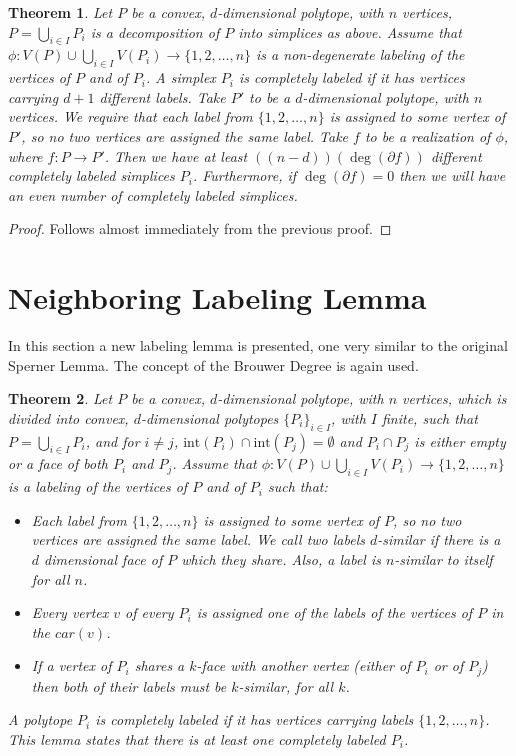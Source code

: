 \documentclass[11pt]{amsart}
\newtheorem{thm}{Theorem}[section]
\theoremstyle{definition}
\theoremstyle{remark}
\numberwithin{equation}{section}
\theoremstyle{definition}
\newcommand{\inte}{\textrm{int}}
\begin{document}
	\begin{thm}\label{generlization 1} Let $P$ be a convex, $d$-dimensional polytope, with $n$ vertices,  $P=\bigcup_{i\in I}P_i$ is a decomposition of $P$ into simplices as above. Assume that $\phi:V(P)\cup\bigcup_{i\in I}V(P_i)\to\{1,2,\ldots,n\}$ is a \emph{non-degenerate} labeling of the vertices of $P$ and of $P_i$. A simplex $P_i$ is completely labeled if it has vertices carrying $d+1$ different labels. Take $P'$ to be a $d$-dimensional polytope, with $n$ vertices. We require that each label from $\{1,2,\ldots,n\}$ is assigned to some  vertex of $P'$, so  no two vertices are assigned the same label. Take $f$ to be a realization of $\phi$, where $f: P \to P'$. Then we have at least $((n-d))(\deg(\partial f))$ different completely labeled simplices $P_i$. Furthermore, if $\deg(\partial f)=0$ then we will have an even number of completely labeled simplices.      
		
	\end{thm} 
	
	\begin{proof}
		Follows almost immediately from the previous proof.	
	\end{proof}
	
	\section{Neighboring Labeling Lemma}
	
	In this section a new labeling lemma is presented, one very similar to the original Sperner Lemma. The concept of the Brouwer Degree is again used.   
	
\begin{thm}
	Let $P$ be a convex, $d$-dimensional polytope, with $n$ vertices, which is divided into convex, $d$-dimensional polytopes $\{P_i\}_{i\in I}$, with $I$ finite, such that $P=\bigcup_{i\in I}P_i$, and  for $i\neq j$, $\inte (P_i)\cap \inte (P_j)=\emptyset$ and $P_i\cap P_j$ is either empty or a face of both $P_i$ and $P_j$. Assume that $\phi:V(P)\cup\bigcup_{i\in I}V(P_i)\to\{1,2,\ldots,n\}$ is a labeling of the vertices of $P$ and of $P_i$ such that:
\begin{itemize}
	\item  Each label from $\{1,2,\ldots,n\}$ is assigned to some  vertex of $P$, so no two vertices are assigned the same label. We call two labels $d$-similar if there is a $d$ dimensional face of $P$ which they share. Also, a label is $n$-similar to itself for all $n$.
	\item Every vertex $v$ of every $P_i$ is assigned one of the labels of the vertices of $P$ in the $car(v)$.
	\item If a vertex of $P_i$  shares a $k$-face with another vertex (either of $P_i$ or of $P_j$) then both of their labels must be $k$-similar, for all $k$.
\end{itemize}

A polytope $P_i$ is completely labeled if it has vertices carrying labels $\{1,2,\ldots, n\}$. This lemma states that there is at least one completely labeled $P_i$.

\end{thm}
	
\end{document}
